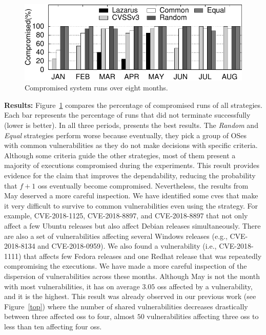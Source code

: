 \begin{figure}[h]
\begin{center}
\includegraphics[width=\columnwidth]{images/gnuplot/executions/execution.pdf}
\caption{Compromised system runs over eight months.}
\label{fig:all_vulns}
\end{center}
\end{figure}


\textbf{Results:} Figure~\ref{fig:all_vulns} compares the percentage of compromised runs of all strategies. 
Each bar represents the percentage of runs that did not terminate successfully (lower is better). 
In all three periods, \system presents the best results. 
The \emph{Random} and \emph{Equal} strategies perform worse because eventually, they pick a group of OSes with common vulnerabilities as they do not make decisions with specific criteria. 
Although some criteria guide the other strategies, most of them present a majority of executions compromised during the experiments.
This result provides evidence for the claim that \system improves the dependability, reducing the probability that $f+1$ \glspl{os} eventually become compromised. 
Nevertheless, the results from May deserved a more careful inspection. 
We have identified some \glspl{cve} that make it very difficult to survive to common vulnerabilities even using the \system strategy.
For example, CVE-2018-1125, CVE-2018-8897, and CVE-2018-8897 that not only affect a few Ubuntu releases but also affect Debian releases simultaneously.
There are also a set of vulnerabilities affecting several Windows releases (e.g., CVE-2018-8134 and CVE-2018-0959). 
We also found a vulnerability (i.e., CVE-2018-1111) that affects few Fedora releases and one Redhat release that was repeatedly compromising the executions.
We have made a more careful inspection of the dispersion of vulnerabilities across these months. 
Although May is not the month with most vulnerabilities, it has on average $3.05$ \glspl{os} affected by a vulnerability, and it is the highest.
This result was already observed in our previous work (see Figure~\ref{top}) where the number of shared vulnerabilities decreases drastically between three affected \glspl{os} to four, almost $50$ vulnerabilities affecting three \glspl{os} to less than ten affecting four \glspl{os}. 

